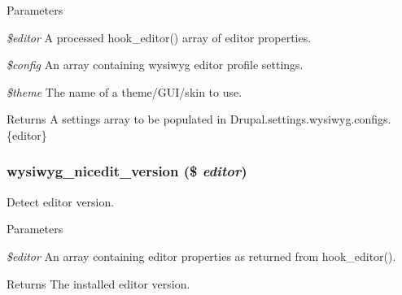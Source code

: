 \begin{DoxyParams}{Parameters}
\item[{\em \$editor}]A processed hook\_\-editor() array of editor properties. \item[{\em \$config}]An array containing wysiwyg editor profile settings. \item[{\em \$theme}]The name of a theme/GUI/skin to use.\end{DoxyParams}
\begin{DoxyReturn}{Returns}
A settings array to be populated in Drupal.settings.wysiwyg.configs.\{editor\} 
\end{DoxyReturn}
\hypertarget{nicedit_8inc_a8915ea024241d8faa74d660eeb6eed62}{
\subsubsection[{wysiwyg\_\-nicedit\_\-version}]{\setlength{\rightskip}{0pt plus 5cm}wysiwyg\_\-nicedit\_\-version (\$ {\em editor})}}
\label{nicedit_8inc_a8915ea024241d8faa74d660eeb6eed62}
Detect editor version.


\begin{DoxyParams}{Parameters}
\item[{\em \$editor}]An array containing editor properties as returned from hook\_\-editor().\end{DoxyParams}
\begin{DoxyReturn}{Returns}
The installed editor version. 
\end{DoxyReturn}
